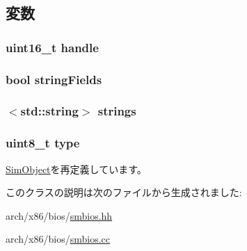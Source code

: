\subsection{変数}
\hypertarget{classX86ISA_1_1SMBios_1_1SMBiosStructure_af242d6e3b6108ea75e1eb236e94c8240}{
\subsubsection[{handle}]{\setlength{\rightskip}{0pt plus 5cm}uint16\_\-t {\bf handle}}}
\label{classX86ISA_1_1SMBios_1_1SMBiosStructure_af242d6e3b6108ea75e1eb236e94c8240}
\hypertarget{classX86ISA_1_1SMBios_1_1SMBiosStructure_aa9458a1718dbd53456d513c7b8f0261e}{
\subsubsection[{stringFields}]{\setlength{\rightskip}{0pt plus 5cm}bool {\bf stringFields}}}
\label{classX86ISA_1_1SMBios_1_1SMBiosStructure_aa9458a1718dbd53456d513c7b8f0261e}
\hypertarget{classX86ISA_1_1SMBios_1_1SMBiosStructure_a0947426a73b52df3fb6348b3e72a1442}{
\subsubsection[{strings}]{$<$std::string$>$ {\bf strings}}}
\label{classX86ISA_1_1SMBios_1_1SMBiosStructure_a0947426a73b52df3fb6348b3e72a1442}
\hypertarget{classX86ISA_1_1SMBios_1_1SMBiosStructure_a1d127017fb298b889f4ba24752d08b8e}{
\subsubsection[{type}]{\setlength{\rightskip}{0pt plus 5cm}uint8\_\-t {\bf type}}}
\label{classX86ISA_1_1SMBios_1_1SMBiosStructure_a1d127017fb298b889f4ba24752d08b8e}


\hyperlink{classm5_1_1SimObject_1_1SimObject_acce15679d830831b0bbe8ebc2a60b2ca}{SimObject}を再定義しています。

このクラスの説明は次のファイルから生成されました:\begin{DoxyCompactItemize}
\item 
arch/x86/bios/\hyperlink{smbios_8hh}{smbios.hh}\item 
arch/x86/bios/\hyperlink{smbios_8cc}{smbios.cc}\end{DoxyCompactItemize}
